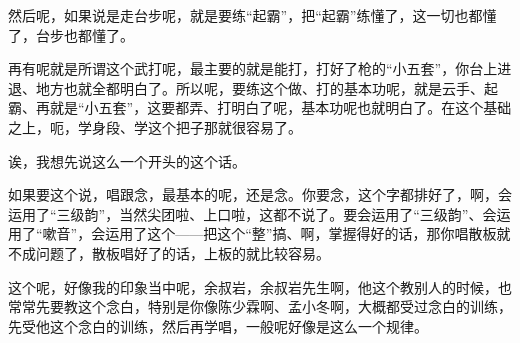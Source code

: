 {然后呢，如果说是走台步呢，就是要练``起霸''，把``起霸''练懂了，这一切也都懂了，台步也都懂了。}

{再有呢就是所谓这个武打呢，最主要的就是能打，打好了枪的``小五套''，你台上进退、地方也就全都明白了。所以呢，要练这个做、打的基本功呢，就是云手、起霸、再就是``小五套''，这要都弄、打明白了呢，基本功呢也就明白了。在这个基础之上，呃，学身段、学这个把子那就很容易了。}

{诶，我想先说这么一个开头的这个话。}

{如果要这个说，唱跟念，最基本的呢，还是念。你要念，这个字都排好了，啊，会运用了``三级韵''，当然尖团啦、上口啦，这都不说了。要会运用了``三级韵''、会运用了``嗽音''，会运用了这个------把这个``整''搞、啊，掌握得好的话，那你唱散板就不成问题了，散板唱好了的话，上板的就比较容易。}

{这个呢，好像我的印象当中呢，余叔岩，余叔岩先生啊，他这个教别人的时候，也常常先要教这个念白，特别是你像陈少霖啊、孟小冬啊，大概都受过念白的训练，先受他这个念白的训练，然后再学唱，一般呢好像是这么一个规律。}
\newpage

